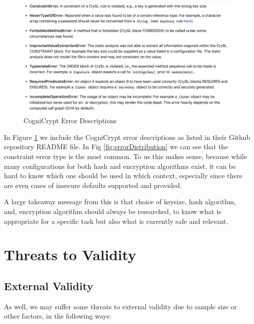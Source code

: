 \documentclass[10pt, conference]{IEEEtran}
\begin{document}
\begin{figure}[h]
\begin{center}
\includegraphics[width=0.9\linewidth]{cogrules.png}
\caption{CogniCrypt Error Descriptions \label{fig:cogrules}}
\end{center}
\end{figure}

In Figure \ref{fig:cogrules} we include the CogniCrypt error descriptions as listed in their Github repository README file. In Fig \ref{fig:errorDistribution} we can see that the constraint error type is the most common. To us this makes sense, because while many configurations for both hash and encryption algorithms exist, it can be hard to know which one should be used in which context, especially since there are even cases of insecure defaults supported and provided. 

A large takeaway message from this is that choice of keysize, hash algorithm, and, encryption algorithm should always be researched, to know what is appropriate for a specific task but also what is currently safe and relevant.

\section{Threats to Validity}

\subsection{External Validity}
As well, we may suffer some threats to external validity due to sample size or other factors, in the  following ways:
\end{document}

